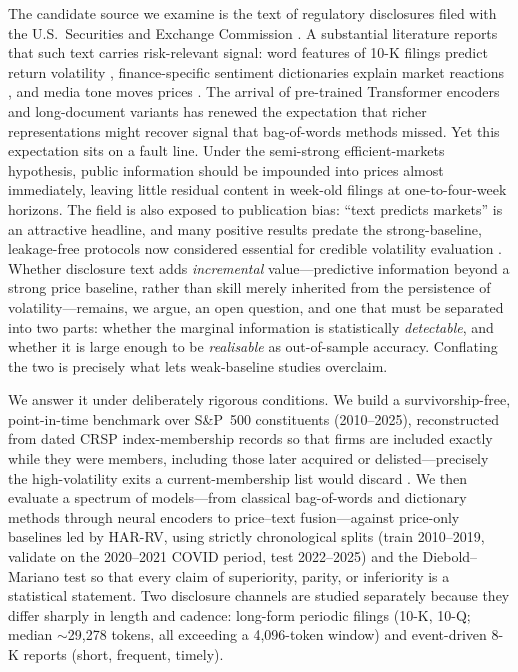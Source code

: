 The candidate source we examine is the text of regulatory disclosures filed with the U.S.\ Securities and Exchange Commission \citep{sec2024edgar}. A substantial literature reports that such text carries risk-relevant signal: word features of 10-K filings predict return volatility \citep{kogan2009predicting}, finance-specific sentiment dictionaries explain market reactions \citep{loughran2011liability}, and media tone moves prices \citep{tetlock2007giving}. The arrival of pre-trained Transformer encoders \citep{devlin2019bert} and long-document variants \citep{beltagy2020longformer} has renewed the expectation that richer representations might recover signal that bag-of-words methods missed. Yet this expectation sits on a fault line. Under the semi-strong efficient-markets hypothesis, public information should be impounded into prices almost immediately, leaving little residual content in week-old filings at one-to-four-week horizons. The field is also exposed to publication bias: ``text predicts markets'' is an attractive headline, and many positive results predate the strong-baseline, leakage-free protocols now considered essential for credible volatility evaluation \citep{hansen2005garch,poon2003forecasting}. Whether disclosure text adds \emph{incremental} value---predictive information beyond a strong price baseline, rather than skill merely inherited from the persistence of volatility---remains, we argue, an open question, and one that must be separated into two parts: whether the marginal information is statistically \emph{detectable}, and whether it is large enough to be \emph{realisable} as out-of-sample accuracy. Conflating the two is precisely what lets weak-baseline studies overclaim.

We answer it under deliberately rigorous conditions. We build a survivorship-free, point-in-time benchmark over S\&P~500 constituents (2010--2025), reconstructed from dated CRSP index-membership records so that firms are included exactly while they were members, including those later acquired or delisted---precisely the high-volatility exits a current-membership list would discard \citep{crsp2026data}. We then evaluate a spectrum of models---from classical bag-of-words and dictionary methods through neural encoders to price--text fusion---against price-only baselines led by HAR-RV, using strictly chronological splits (train 2010--2019, validate on the 2020--2021 COVID period, test 2022--2025) and the Diebold--Mariano test \citep{diebold1995comparing} so that every claim of superiority, parity, or inferiority is a statistical statement. Two disclosure channels are studied separately because they differ sharply in length and cadence: long-form periodic filings (10-K, 10-Q; median $\sim$29{,}278 tokens, all exceeding a 4{,}096-token window) and event-driven 8-K reports (short, frequent, timely).

